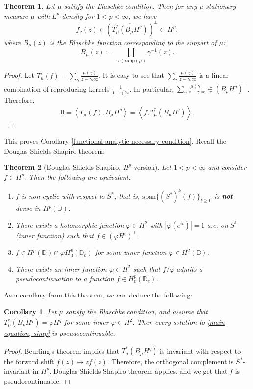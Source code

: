 \documentclass[11pt]{article}
\newtheorem{theorem}{Theorem}[section]
\newtheorem{corollary}{Corollary}[section]
\begin{document}
\begin{theorem}
	Let $\mu$ satisfy the Blaschke condition. Then for any $\mu$-stationary measure $\mu$ with $L^p$-density for $1 < p < \infty$, we have
	\[
	f_\nu(z) \in (\overline{T_\mu^*(B_\mu H^q)})^{\perp} \subset H^p,
	\]
	where $B_\mu(z)$ is the Blaschke function corresponding to the support of $\mu$:
	\[
	B_\mu(z) := \prod_{\gamma \in \text{supp}(\mu)} \gamma^{-1}(z).
	\]
\end{theorem}

\begin{proof}
	Let $T_\mu(f) = \sum_{\gamma} \frac{\mu(\gamma)}{z - \gamma.\infty}$. It is easy to see that $\sum_{\gamma} \frac{\mu(\gamma)}{z - \gamma.\infty}$ is a linear combination of reproducing kernels $\frac{1}{1 - \overline{\gamma.0}z}$. In particular, $\sum_{\gamma} \frac{\mu(\gamma)}{z - \gamma.\infty} \in (B_\mu H^q)^\perp$. Therefore,
	\[
	0 = \left\langle T_\mu(f), B_\mu H^q \right\rangle = \left\langle f, \overline{T_\mu^*(B_\mu H^q)} \right\rangle.
	\]
\end{proof}

This proves Corollary \ref{functional-analytic necessary condition}. Recall the Douglas-Shields-Shapiro theorem:

\begin{theorem}[Douglas-Shields-Shapiro, $H^p$-version]
	Let $1 < p < \infty$ and consider $f \in H^p$. Then the following are equivalent:
	\begin{enumerate}
		\item $f$ is non-cyclic with respect to $S^*$, that is, $\text{span}\{ (S^*)^k(f) \}_{k \ge 0}$ is \textbf{not} dense in $H^p(\mathbb{D})$.
		\item There exists a holomorphic function $\varphi \in H^2$ with $|\varphi(e^{it})| = 1$ a.e. on $S^1$ (inner function) such that $f \in (\varphi H^q)^\perp$.
		\item $f \in H^p(\mathbb{D}) \cap \varphi H^p_0(\mathbb{D}_e)$ for some inner function $\varphi \in H^2(\mathbb{D})$.
		\item There exists an inner function $\varphi \in H^2$ such that $f / \varphi$ admits a pseudocontinuation to a function $\tilde{f} \in H^p_0(\mathbb{D}_e)$.
	\end{enumerate} 
\end{theorem}

As a corollary from this theorem, we can deduce the following:

\begin{corollary}
	Let $\mu$ satisfy the Blaschke condition, and assume that $\overline{T_\mu^*(B_\mu H^q)} = \varphi H^q$ for some inner $\varphi \in H^2$. Then every solution to \eqref{main equation, simp} is pseudocontinuable.
\end{corollary}
\begin{proof}
	Beurling's theorem implies that $\overline{T_\mu^*(B_\mu H^q)}$ is invariant with respect to the forward shift $f(z) \mapsto zf(z)$. Therefore, the orthogonal complement is $S^*$-invariant in $H^p$. Douglas-Shields-Shapiro theorem applies, and we get that $f$ is pseudocontinuable.
\end{proof}
\end{document}
